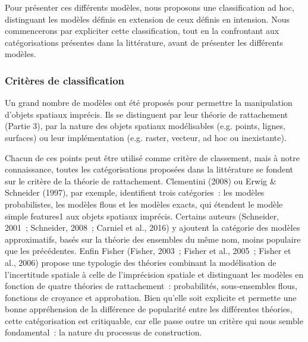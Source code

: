   Pour présenter ces différents modèles, nous proposons une
  classification ad hoc, distinguant les modèles définis en extension
  de ceux définis en intension. Nous commencerons par expliciter cette
  classification, tout en la confrontant aux catégorisations présentes
  dans la littérature, avant de présenter les différents modèles.

  \subsubsection{Critères de classification}

Un grand nombre de modèles ont été proposés pour permettre la
manipulation d’objets spatiaux imprécis. Ils se distinguent par leur
théorie de rattachement (Partie 3), par la nature des objets spatiaux
modélisables (e.g. points, lignes, surfaces) ou leur implémentation
(e.g. raster, vecteur, ad hoc ou inexistante).

Chacun de ces points peut être utilisé comme critère de classement,
mais à notre connaissance, toutes les catégorisations proposées dans
la littérature se fondent sur le critère de la théorie de
rattachement. Clementini (2008) ou Erwig \& Schneider (1997), par
exemple, identifient trois catégories : les modèles probabilistes, les
modèles flous et les modèles exacts, qui étendent le modèle simple
features1 aux objets spatiaux imprécis. Certains auteurs (Schneider,
2001 ; Schneider, 2008 ; Carniel et al., 2016) y ajoutent la catégorie
des modèles approximatifs, basés sur la théorie des ensembles du même
nom, moins populaire que les précédentes. Enfin Fisher (Fisher, 2003 ;
Fisher et al., 2005 ; Fisher et al., 2006) propose une typologie des
théories combinant la modélisation de l’incertitude spatiale à celle
de l’imprécision spatiale et distinguant les modèles en fonction de
quatre théories de rattachement : probabilités, sous-ensembles flous,
fonctions de croyance et approbation. Bien qu’elle soit explicite et
permette une bonne appréhension de la différence de popularité entre
les différentes théories, cette catégorisation est critiquable, car
elle passe outre un critère qui nous semble fondamental : la nature du
processus de construction.

